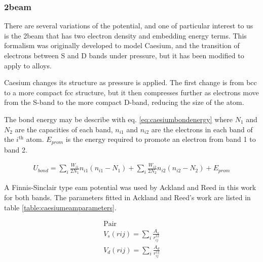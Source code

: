 \subsubsection{\Acrlong{2beam}}
\label{section:2beam}

There are several variations of the  potential, and one of particular interest to us is the \acrlong{2beam} that has two electron density and embedding energy terms.  This formalism was originally developed to model Caesium\cite{twobandackland}, and the transition of electrons between S and D bands under pressure, but it has been modified to apply to alloys.

Caesium changes its structure as pressure is applied.  The first change is from \acrshort{bcc} to a more compact \acrshort{fcc} structure, but it then compresses further as electrons move from the S-band to the more compact D-band, reducing the size of the atom.

The bond energy may be describe with eq. \ref{eq:caesiumbondenergy} where $N_1$ and $N_2$ are the capacities of each band, $n_{i1}$ and $n_{i2}$ are the electrons in each band of the $i^{\text{th}}$ atom.  $E_{prom}$ is the energy required to promote an electron from band 1 to band 2.

\begin{equation}
\begin{split}
U_{bond} = \sum_i \frac{W_{i1}}{2N_1} n_{i1}(n_{i1} - N_1) + \sum_i \frac{W_{i2}}{2N_2} n_{i2}(n_{i2} - N_2) + E_{prom}
\end{split}
\label{eq:caesiumbondenergy}
\end{equation}

A Finnis-Sinclair type \acrshort{eam} potential was used by Ackland and Reed in this work for both bands.  The parameters fitted in Ackland and Reed's work are listed in table \ref{table:caesiumeamparameters}.  

\begin{equation}
\begin{split}
\text{Pair} \\
V_s(r{ij}) = \sum_i \frac{A_s}{r^{12}_{ij}} \\
V_d(r{ij}) = \sum_i \frac{A_d}{r^{12}_{ij}} \\
\end{split}
\label{eq:caesium2beampair}
\end{equation}

